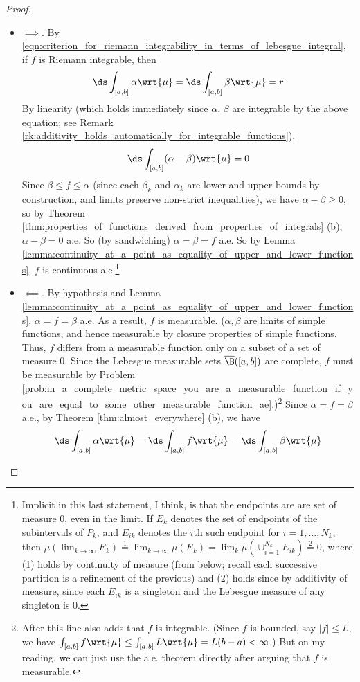\documentclass{article} %
\newcommand{\dmu}{\wrt{\mu}}
\begin{document}
\begin{proof}
\begin{alphabate}
\item
\begin{itemize}
\item $\boxed{\implies}$.  By \eqref{eqn:criterion_for_riemann_integrability_in_terms_of_lebesgue_integral}, if $f$ is Riemann integrable, then 
\[ \ds\int_{[a,b]} \alpha \dmu = \ds\int_{[a,b]} \beta \dmu = r\]
By linearity {\tiny (which holds immediately since $\alpha$, $\beta$ are integrable by the above equation; see Remark \ref{rk:additivity_holds_automatically_for_integrable_functions})}, 
\[  \ds\int_{[a,b]} (\alpha-\beta) \dmu =0  \]
Since $\beta \leq f \leq \alpha$ {\tiny (since each $\beta_k$ and $\alpha_k$ are lower and upper bounds by construction, and limits preserve non-strict inequalities)}, we have $\alpha-\beta \geq 0$, so by Theorem \ref{thm:properties_of_functions_derived_from_properties_of_integrals} (b), $\alpha-\beta =0$ a.e.  So {\tiny (by sandwiching)} $\alpha=\beta=f$ a.e.   So by Lemma \ref{lemma:continuity_at_a_point_as_equality_of_upper_and_lower_functions}, $f$ is continuous a.e.\footnote{Implicit in this last statement, I think, is that the endpoints are are set of measure 0, even in the limit.  If $E_k$ denotes the set of endpoints of the subintervals of $P_k$, and $E_{ik}$ denotes the $i$th such endpoint for $i=1,...,N_k$, then $\mu(\lim_{k \to \infty} E_k) \stackrel{1}{=} \lim_{k \to \infty} \mu(E_k) = \lim_k \mu(\cup_{i=1}^{N_k} E_{ik}) \stackrel{2}{=} 0$, where (1) holds by continuity of measure (from below; recall each successive partition is a refinement of the previous) and (2) holds since by additivity of measure, since each $E_{ik}$ is a singleton and the Lebesgue measure of any singleton is 0.
}
\item $\boxed{\impliedby}$.  By hypothesis and Lemma  \ref{lemma:continuity_at_a_point_as_equality_of_upper_and_lower_functions}, $\alpha = f = \beta$ a.e.   As a result, $f$ is measurable.   {\tiny ($\alpha, \beta$ are limits of simple functions, and hence measurable by closure properties of simple functions.  Thus, $f$ differs from a measurable function only on a subset of a set of measure 0.   Since the Lebesgue measurable sets $\overline{\B}([a,b])$ are complete, $f$ must be measurable by Problem \ref{prob:in_a_complete_metric_space_you_are_a_measurable_function_if_you_are_equal_to_some_other_measurable_function_ae}.)}\footnote{After this line \cite{ash2000probability} also adds that $f$ is integrable. {\tiny (Since $f$ is bounded, say $|f| \leq L$, we have $\int_{[a,b]} f \dmu \leq \int_{[a,b]} L \dmu = L (b-a) < \infty $.) } But on my reading, we can just use the a.e. theorem directly after arguing that $f$ is measurable.} Since $\alpha=f=\beta$ a.e., by Theorem \ref{thm:almost_everywhere} (b),  we have
\begin{align}
\ds\int_{[a,b]} \alpha \dmu =  \ds\int_{[a,b]} f \dmu  = \ds\int_{[a,b]} \beta \dmu  
\label{eqn:lebesgue_integral_of_riemann_integral_fucntion_equals_the_lebesgue_integral_of_the_limits_of_the_upper_and_lower_functions}
\end{align}


\end{itemize}
\end{alphabate}
\end{proof}
\end{document}
